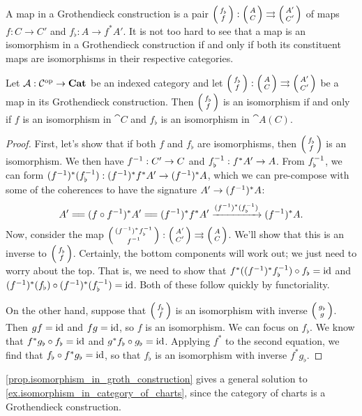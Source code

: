 \documentclass[DynamicalBook]{subfiles}
\begin{document}
A map in a Grothendieck construction is a pair $\lens{f_{\flat}}{f} :
\lens{A}{C} \tto \lens{A'}{C'}$ of maps $f : C \to C'$ and $f_{\flat}: A \to
f^{\ast}A'$. It is not too hard to see that a map is an isomorphism in a Grothendieck
construction if and only if both its constituent maps are isomorphisms in their
respective categories.

\begin{proposition}\label{prop.isomorphism_in_groth_construction}
Let $\mathcal{A} : \mathcal{C}^{\textnormal{op}} \to \textbf{Cat}$ be an indexed category and let $\lens{f_{\flat}}{f} :
\lens{A}{C} \tto \lens{A'}{C'}$ be a map in its Grothendieck construction. Then
$\lens{f_{\flat}}{f}$ is an isomorphism if and only if $f$ is an isomorphism in
$\cat{C}$ and $f_{\flat}$ is an isomorphism in $\cat{A}(C)$.
\end{proposition}
\begin{proof}
First, let's show that if both $f$ and $f_{\flat}$ are isomorphisms, then
$\lens{f_{\flat}}{f}$ is an isomorphism. We then have $f^{-1} : C' \to C$ and
$f_{\flat}^{-1} : f^{\ast}A' \to A$. From $f_{\flat}^{-1}$, we can form
$(f^{-1})^{\ast} (f_{\flat}^{-1}) : (f^{-1})^{\ast}f^{\ast} A' \to
(f^{-1})^{\ast}A$, which we can pre-compose with some of the coherences to have
the signature $A' \to (f^{-1})^{\ast} A$:
$$A' \xequals{\,} (f \circ f\inv)^{\ast} A' \xequals{\,} 
(f\inv)^{\ast} f^{\ast} A' \xto{(f\inv)^{\ast} (f_{\flat}\inv)} (f\inv)^{\ast} A.$$
Now, consider the map $\lens{(f\inv)^{\ast}f_{\flat}\inv}{f\inv} : \lens{A'}{C'}
\tto \lens{A}{C}$. We'll show that this is an
inverse to $\lens{f_{\flat}}{f}$. Certainly, the bottom components will work
out; we just need to worry about the top. That is, we need to show that
$f^{\ast}((f^{-1})^{\ast} f_{\flat}^{-1}) \circ f_{\flat} = \mathrm{id}$ and
$(f^{-1})^{\ast}(f_{\flat}) \circ (f^{-1})^{\ast}(f_{\flat}^{-1}) = \mathrm{id}$. Both of
these follow quickly by functoriality.

On the other hand, suppose that $\lens{f_{\flat}}{f}$ is an isomorphism with
inverse $\lens{g_{\flat}}{g}$. Then $gf = \mathrm{id}$ and $fg = \mathrm{id}$, so $f$ is an
isomorphism. We can focus on $f_{\flat}$. We know that $f^{\ast}g_{\flat} \circ
f_{\flat} = \mathrm{id}$ and $g^{\ast}f_{\flat} \circ g_{\flat} = \mathrm{id}$. Applying
$f^{\ast}$ to the second equation, we find that $f_{\flat} \circ
f^{\ast}g_{\flat} = \mathrm{id}$, so that $f_{\flat}$ is an isomorphism with inverse $f^{\ast}g_{\flat}$.
\end{proof}  

\begin{remark}
  \cref{prop.isomorphism_in_groth_construction} gives a general solution to
  \cref{ex.isomorphism_in_category_of_charts}, since the category of charts is a
  Grothendieck construction.
\end{remark}
\end{document}
